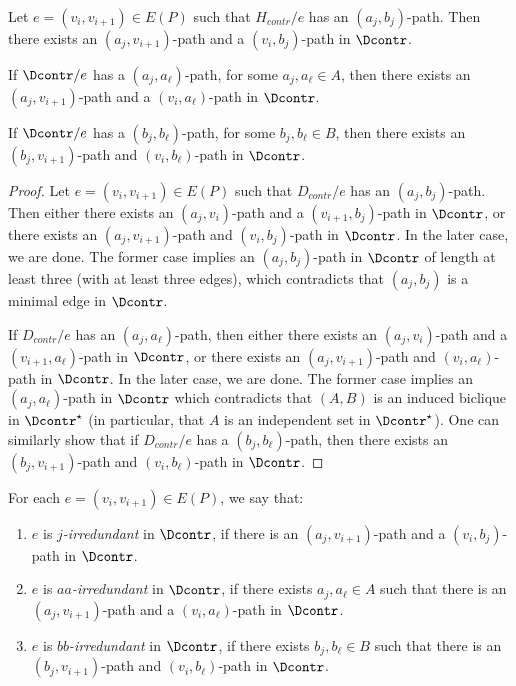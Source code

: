 \begin{lemma}\label{obs:biclique1}
Let $e=(v_i,v_{i+1}) \in E(P)$ such that $H_{contr}/e$ has an $(a_j,b_j)$-path. Then there exists an $(a_j,v_{i+1})$-path and a $(v_i,b_j)$-path in $\Dcontr$.

If $\Dcontr/e$ has a $(a_j,a_{\ell})$-path, for some $a_j,a_{\ell} \in A$, then there exists an $(a_j, v_{i+1})$-path and a $(v_i,a_{\ell})$-path in $\Dcontr$.

If $\Dcontr/e$ has a $(b_j,b_{\ell})$-path, for some $b_j,b_{\ell} \in B$, then there exists an $(b_j, v_{i+1})$-path and $(v_i,b_{\ell})$-path in $\Dcontr$.
\end{lemma}

\begin{proof}
Let $e=(v_i,v_{i+1}) \in E(P)$ such that $D_{contr}/e$ has an $(a_j,b_j)$-path. Then either there exists an $(a_j,v_i)$-path and a $(v_{i+1},b_j)$-path in $\Dcontr$, or there exists an $(a_j,v_{i+1})$-path and $(v_i,b_j)$-path in $\Dcontr$. In the later case, we are done. The former case implies an $(a_j,b_j)$-path in $\Dcontr$ of length at least three (with at least three edges), which contradicts that $(a_j,b_j)$ is a minimal edge in $\Dcontr$.

If $D_{contr}/e$ has an $(a_j,a_{\ell})$-path, then either there exists an $(a_j,v_i)$-path and a $(v_{i+1},a_{\ell})$-path in $\Dcontr$, or there exists an $(a_j,v_{i+1})$-path and $(v_i,a_{\ell})$-path in $\Dcontr$. In the later case, we are done. The former case implies an $(a_j,a_{\ell})$-path in $\Dcontr$ which contradicts that $(A,B)$ is an induced biclique in $\Dcontr^{\star}$ (in particular, that $A$ is an independent set in $\Dcontr^{\star}$).
One can similarly show that if $D_{contr}/e$ has a $(b_j,b_{\ell})$-path, then there exists an $(b_j,v_{i+1})$-path and $(v_i,b_{\ell})$-path in $\Dcontr$.
\end{proof}

For each $e=(v_i,v_{i+1}) \in E(P)$, we say that:
\begin{enumerate}
\item $e$ is {\em $j$-irredundant} in $\Dcontr$, if there is an $(a_j,v_{i+1})$-path and a $(v_i,b_j)$-path in $\Dcontr$.
\item $e$ is {\em $aa$-irredundant} in $\Dcontr$, if there exists $a_j,a_{\ell} \in A$ such that there is an $(a_j,v_{i+1})$-path and a $(v_i,a_{\ell})$-path in $\Dcontr$.
\item  $e$ is {\em $bb$-irredundant} in $\Dcontr$, if there exists $b_j,b_{\ell} \in B$ such that there is an $(b_j,v_{i+1})$-path and $(v_i,b_{\ell})$-path in $\Dcontr$.
\end{enumerate}


